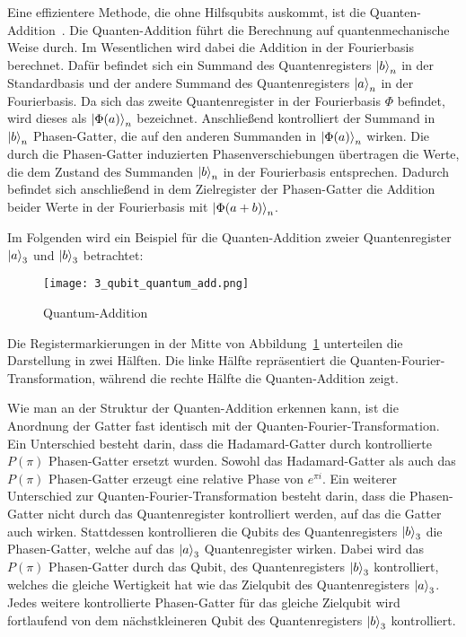 Eine effizientere Methode, die ohne Hilfsqubits auskommt, ist die Quanten-Addition~\cite{draper2000addition}. 
Die Quanten-Addition führt die Berechnung auf quantenmechanische Weise durch. 
Im Wesentlichen wird dabei die Addition in der Fourierbasis berechnet. 
Dafür befindet sich ein Summand des Quantenregisters \(\ket{b}_n\) in der Standardbasis und 
der andere Summand des Quantenregisters \(\ket{a}_n\) in der Fourierbasis.
Da sich das zweite Quantenregister in der Fourierbasis \(\Phi\) befindet, 
wird dieses als \(\ket{\Phi(a)}_n\) bezeichnet.
Anschließend kontrolliert der Summand in \(\ket{b}_n\) Phasen-Gatter, 
die auf den anderen Summanden in \(\ket{\Phi(a)}_n\) wirken.
Die durch die Phasen-Gatter induzierten Phasenverschiebungen übertragen die Werte, 
die dem Zustand des Summanden \(\ket{b}_n\) in der Fourierbasis entsprechen.
Dadurch befindet sich anschließend in dem Zielregister der Phasen-Gatter die Addition beider Werte in der Fourierbasis mit \(\ket{\Phi(a+b)}_n\).

Im Folgenden wird ein Beispiel für die Quanten-Addition zweier Quantenregister \(\ket{a}_3\) und \(\ket{b}_3\) betrachtet:
\begin{figure}[H]
    \centering
    \texttt{[image: 3\_qubit\_quantum\_add.png]}
    \caption{Quantum-Addition}
    \label{fig:3_qubit_quantum_add}
  \end{figure}
Die Registermarkierungen in der Mitte von Abbildung~\ref{fig:3_qubit_quantum_add} unterteilen die Darstellung in zwei Hälften.
Die linke Hälfte repräsentiert die Quanten-Fourier-Transformation, 
während die rechte Hälfte die Quanten-Addition zeigt.

Wie man an der Struktur der Quanten-Addition erkennen kann,
ist die Anordnung der Gatter fast identisch mit der Quanten-Fourier-Transformation.
Ein Unterschied besteht darin, 
dass die Hadamard-Gatter durch kontrollierte \(P(\pi)\) Phasen-Gatter ersetzt wurden.
Sowohl das Hadamard-Gatter als auch das \(P(\pi)\) Phasen-Gatter erzeugt eine relative Phase von \(e^{\pi i}\).
Ein weiterer Unterschied zur Quanten-Fourier-Transformation besteht darin, 
dass die Phasen-Gatter nicht durch das Quantenregister kontrolliert werden, 
auf das die Gatter auch wirken.
Stattdessen kontrollieren die Qubits des Quantenregisters \(\ket{b}_3\) die Phasen-Gatter, 
welche auf das \(\ket{a}_3\) Quantenregister wirken.
Dabei wird das \(P(\pi)\) Phasen-Gatter durch das Qubit, des Quantenregisters \(\ket{b}_3\) kontrolliert,
welches die gleiche Wertigkeit hat wie das Zielqubit des Quantenregisters \(\ket{a}_3\).
Jedes weitere kontrollierte Phasen-Gatter für das gleiche Zielqubit 
wird fortlaufend von dem nächstkleineren Qubit des Quantenregisters \(\ket{b}_3\) kontrolliert.

